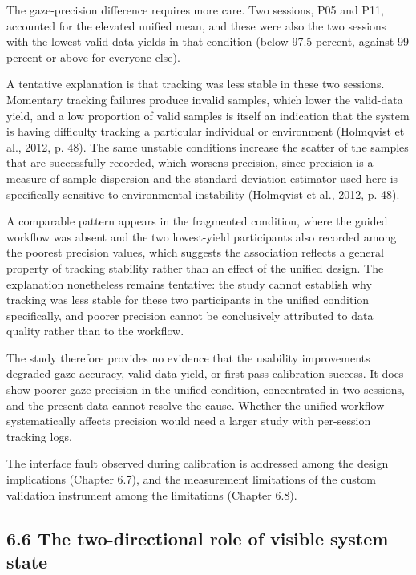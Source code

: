 \documentclass[
]{article}
\begin{document}
The gaze-precision difference requires more care. Two sessions, P05 and P11, accounted for the elevated unified mean, and these were also the two sessions with the lowest valid-data yields in that condition (below 97.5 percent, against 99 percent or above for everyone else).

A tentative explanation is that tracking was less stable in these two sessions. Momentary tracking failures produce invalid samples, which lower the valid-data yield, and a low proportion of valid samples is itself an indication that the system is having difficulty tracking a particular individual or environment (Holmqvist et al., 2012, p. 48). The same unstable conditions increase the scatter of the samples that are successfully recorded, which worsens precision, since precision is a measure of sample dispersion and the standard-deviation estimator used here is specifically sensitive to environmental instability (Holmqvist et al., 2012, p. 48).

A comparable pattern appears in the fragmented condition, where the guided workflow was absent and the two lowest-yield participants also recorded among the poorest precision values, which suggests the association reflects a general property of tracking stability rather than an effect of the unified design. The explanation nonetheless remains tentative: the study cannot establish why tracking was less stable for these two participants in the unified condition specifically, and poorer precision cannot be conclusively attributed to data quality rather than to the workflow.

The study therefore provides no evidence that the usability improvements degraded gaze accuracy, valid data yield, or first-pass calibration success. It does show poorer gaze precision in the unified condition, concentrated in two sessions, and the present data cannot resolve the cause. Whether the unified workflow systematically affects precision would need a larger study with per-session tracking logs.

The interface fault observed during calibration is addressed among the design implications (Chapter 6.7), and the measurement limitations of the custom validation instrument among the limitations (Chapter 6.8).

\hypertarget{the-two-directional-role-of-visible-system-state}{%
\subsection{\texorpdfstring{6.6 The two-directional role of visible system state }{6.6 The two-directional role of visible system state }}\label{the-two-directional-role-of-visible-system-state}}
\end{document}
